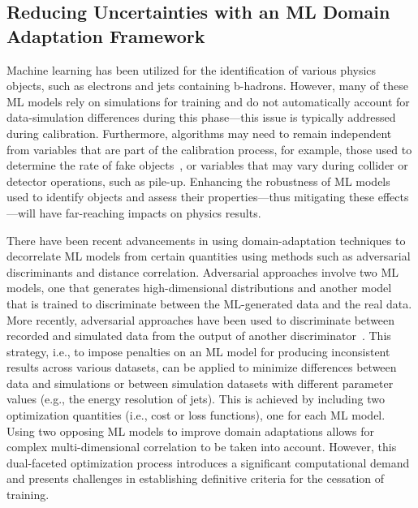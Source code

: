 \documentclass[letter, USenglish, 11pt, subfigure]{article}
\begin{document}
\subsection{Reducing Uncertainties with an ML Domain Adaptation Framework}
Machine learning has been utilized for the identification of various physics objects, such as electrons and jets containing b-hadrons. However, many of these ML models rely on simulations for training and do not automatically account for data-simulation differences during this phase—this issue is typically addressed during calibration. Furthermore, algorithms may need to remain independent from variables that are part of the calibration process, for example, those used to determine the rate of fake objects~\cite{atlas_photon_id}, or variables that may vary during collider or detector operations, such as pile-up. Enhancing the robustness of ML models used to identify objects and assess their properties—thus mitigating these effects—will have far-reaching impacts on physics results.

There have been recent advancements in using domain-adaptation techniques to decorrelate ML models from certain quantities using methods such as adversarial discriminants and distance correlation. Adversarial approaches involve two ML models, one that generates high-dimensional distributions and another model that is trained to discriminate between the ML-generated data and the real data. More recently, adversarial approaches have been used to discriminate between recorded and simulated data from the output of another discriminator~\cite{calRatio}. This strategy, i.e., to impose penalties on an ML model for producing inconsistent results across various datasets, can be applied to minimize differences between data and simulations or between simulation datasets with different parameter values (e.g., the energy resolution of jets). This is achieved by including two optimization quantities (i.e., cost or loss functions), one for each ML model. Using two opposing ML models to improve domain adaptations allows for complex multi-dimensional correlation to be taken into account. However, this dual-faceted optimization process introduces a significant computational demand and presents challenges in establishing definitive criteria for the cessation of training.
\end{document}
